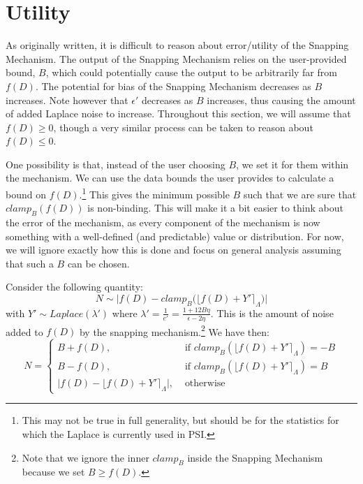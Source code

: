 \documentclass[11pt]{scrartcl} %
\begin{document}
\section{Utility}
As originally written, it is difficult to reason about error/utility of the Snapping Mechanism. The output of the Snapping Mechanism relies on the user-provided bound, $B$, which could potentially cause the output to be arbitrarily far from $f(D)$. The potential for bias of the Snapping Mechanism decreases as $B$ increases. Note however that $\epsilon'$ decreases as $B$ increases, thus causing the amount of added Laplace noise to increase. Throughout this section, we will assume that $f(D) \geq 0$, though a very similar process can be taken to reason about $f(D) \leq 0$. \newline

One possibility is that, instead of the user choosing $B$, we set it for them within the mechanism. We can use the data bounds the user provides to calculate a bound on $f(D)$.\footnote{This may not be true in full generality, but should be for the statistics for which the Laplace is currently used in PSI.} This gives the minimum possible $B$ such that we are sure that $clamp_B \left( f(D) \right)$ is non-binding. This will make it a bit easier to think about the error of the mechanism, as every component of the mechanism is now something with a well-defined (and predictable) value or distribution. For now, we will ignore exactly how this is done and focus on general analysis assuming that such a $B$ can be chosen. \newline

Consider the following quantity:
\[ N \sim \big \vert f(D) - clamp_B \big( \lfloor f(D) + Y' \rceil_{\Lambda} \big) \big \vert \]
with $Y' \sim Laplace(\lambda')$ where $\lambda' = \frac{1}{e'} = \frac{1 + 12B \eta}{\epsilon - 2\eta}$. This is the amount of noise added to $f(D)$ by the snapping mechanism.\footnote{Note that we ignore the inner $clamp_B$ inside the Snapping Mechanism because we set $B \geq f(D)$.} We have then:
\begin{equation}
	N =
		\begin{cases}
			B + f(D), &\text{ if } clamp_B \left( \lfloor f(D) + Y' \rceil_{\Lambda} \right) = -B  \\
			B - f(D), &\text{ if } clamp_B \left( \lfloor f(D) + Y' \rceil_{\Lambda} \right) = B  \\
			\big\vert f(D) - \lfloor f(D) + Y' \rceil_{\Lambda} \big\vert, &\text{ otherwise }
		\end{cases}
\end{equation}
\end{document}
